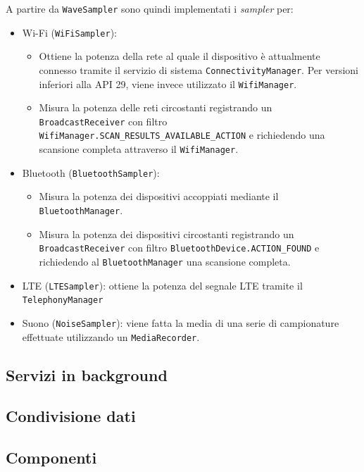 \documentclass[11pt]{article}
\begin{document}
A partire da \texttt{WaveSampler} sono quindi implementati i \textit{sampler} per:
\begin{itemize}
  \item Wi-Fi (\texttt{WiFiSampler}): 
    \begin{itemize}[topsep=0em]
      \item Ottiene la potenza della rete al quale il dispositivo è attualmente connesso tramite il servizio di sistema \texttt{ConnectivityManager}. Per versioni inferiori alla API 29, viene invece utilizzato il \texttt{WifiManager}.
      \item Misura la potenza delle reti circostanti registrando un \texttt{BroadcastReceiver} con filtro \texttt{WifiManager.SCAN\_RESULTS\_AVAILABLE\_ACTION} e richiedendo una scansione completa attraverso il \texttt{WifiManager}.
    \end{itemize}
  \item Bluetooth (\texttt{BluetoothSampler}):
    \begin{itemize}[topsep=0em]
      \item Misura la potenza dei dispositivi accoppiati mediante il \texttt{BluetoothManager}.
      \item Misura la potenza dei dispositivi circostanti registrando un \texttt{BroadcastReceiver} con filtro \texttt{BluetoothDevice.ACTION\_FOUND} e richiedendo al \texttt{BluetoothManager} una scansione completa.
    \end{itemize}
  \item LTE (\texttt{LTESampler}): ottiene la potenza del segnale LTE tramite il \texttt{TelephonyManager}
  \item Suono (\texttt{NoiseSampler}): viene fatta la media di una serie di campionature effettuate utilizzando un \texttt{MediaRecorder}.
\end{itemize}



\subsection{Servizi in background}


\subsection{Condivisione dati}


\subsection{Componenti}
\end{document}
